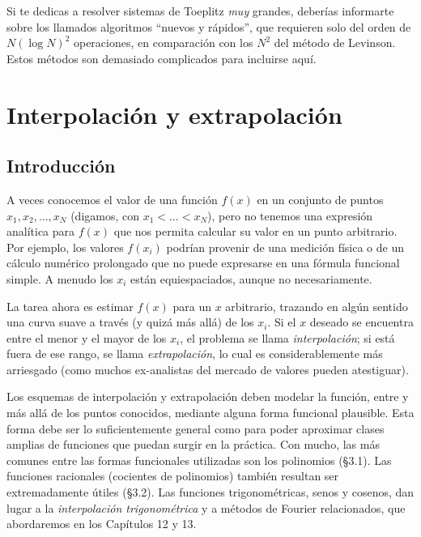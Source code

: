\documentclass[10pt,a4paper]{book}
\begin{document}
Si te dedicas a resolver sistemas de Toeplitz \textit{muy} grandes, deberías informarte sobre los llamados algoritmos “nuevos y rápidos”, que requieren solo del orden de $N (\log N)^2$ operaciones, en comparación con los $N^2$ del método de Levinson. Estos métodos son demasiado complicados para incluirse aquí.


\chapter{Interpolación y extrapolación}
\section{Introducción}

A veces conocemos el valor de una función \( f(x) \) en un conjunto de puntos \( x_1, x_2, \dots, x_N \) (digamos, con \( x_1 < \dots < x_N \)), pero no tenemos una expresión analítica para \( f(x) \) que nos permita calcular su valor en un punto arbitrario. Por ejemplo, los valores \( f(x_i) \) podrían provenir de una medición física o de un cálculo numérico prolongado que no puede expresarse en una fórmula funcional simple. A menudo los \( x_i \) están equiespaciados, aunque no necesariamente.

\medskip

La tarea ahora es estimar \( f(x) \) para un \( x \) arbitrario, trazando en algún sentido una curva suave a través (y quizá más allá) de los \( x_i \). Si el \( x \) deseado se encuentra entre el menor y el mayor de los \( x_i \), el problema se llama \textit{interpolación}; si está fuera de ese rango, se llama \textit{extrapolación}, lo cual es considerablemente más arriesgado (como muchos ex-analistas del mercado de valores pueden atestiguar).

\medskip

Los esquemas de interpolación y extrapolación deben modelar la función, entre y más allá de los puntos conocidos, mediante alguna forma funcional plausible. Esta forma debe ser lo suficientemente general como para poder aproximar clases amplias de funciones que puedan surgir en la práctica. Con mucho, las más comunes entre las formas funcionales utilizadas son los polinomios (\S3.1). Las funciones racionales (cocientes de polinomios) también resultan ser extremadamente útiles (\S3.2). Las funciones trigonométricas, senos y cosenos, dan lugar a la \textit{interpolación trigonométrica} y a métodos de Fourier relacionados, que abordaremos en los Capítulos 12 y 13.
\end{document}
